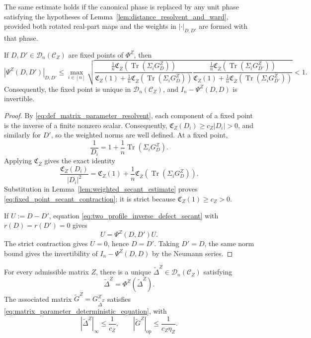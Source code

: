 \documentclass[EJP, preprint, NODS, nobera, nofontexpansion]{ejpecp}
\DeclareMathOperator{\op}{op}
\DeclareMathOperator{\tr}{Tr}
\begin{document}
The same estimate holds if the canonical phase is replaced by any
unit phase satisfying the hypotheses of
Lemma~\ref{lem:distance_resolvent_and_ward}, provided both rotated
real-part maps and the weights in $|\cdot|_{D,D'}$ are formed with
that phase.

\begin{proposition}
\label{pro:fixed_point_secant_contraction}
If \(D,D'\in\mathcal D_n(\mathcal C_Z)\) are fixed points of \(\Phi^Z\),
then
\begin{equation}\label{eq:fixed_point_secant_contraction}
    |\Psi^Z(D,D')|_{D,D'}
    \leq
    \max_{i\in[n]}
    \sqrt{
        \frac{\frac1n\mathfrak C_{\bar Z}\!\left(\tr(\Sigma_iG_D^Z)\right)}{\mathfrak C_Z(1)+\frac1n\mathfrak C_{\bar Z}\!\left(\tr(\Sigma_iG_D^Z)\right)}
        \frac{\frac1n\mathfrak C_{\bar Z}\!\left(\tr(\Sigma_iG_{D'}^Z)\right)}{\mathfrak C_Z(1)+\frac1n\mathfrak C_{\bar Z}\!\left(\tr(\Sigma_iG_{D'}^Z)\right)}
    }
    <1.
\end{equation}
Consequently, the fixed point is unique in
\(\mathcal D_n(\mathcal C_Z)\), and
\(I_n-\Psi^Z(D,D)\) is invertible.

\end{proposition}

\begin{proof}
By \eqref{eq:def_matrix_parameter_resolvent}, each component of a fixed
point is the inverse of a finite nonzero scalar. Consequently,
\(\mathfrak C_Z(D_i)\geq c_Z|D_i|>0\), and similarly for \(D'\),
so the weighted norms are well defined. At a fixed point,
\[
    \frac1{D_i}
    =
    1+\frac1n\tr(\Sigma_iG_D^Z).
\]
Applying \(\mathfrak C_{\bar Z}\) gives the exact identity
\[
    \frac{\mathfrak C_Z(D_i)}{|D_i|^2}
    =
    \mathfrak C_Z(1)+\frac1n\mathfrak C_{\bar Z}\!\left(\tr(\Sigma_iG_D^Z)\right).
\]
Substitution in Lemma~\ref{lem:weighted_secant_estimate} proves
\eqref{eq:fixed_point_secant_contraction}; it is strict because
\(\mathfrak C_Z(1)\geq c_Z>0\).

If \(U:=D-D'\), equation
\eqref{eq:two_profile_inverse_defect_secant} with \(r(D)=r(D')=0\) gives
\[
    U=\Psi^Z(D,D')U.
\]
The strict contraction gives \(U=0\), hence \(D=D'\).
Taking \(D'=D\), the same norm bound gives the invertibility of
\(I_n-\Psi^Z(D,D)\) by the Neumann series.
\end{proof}

\begin{proposition}
\label{pro:matrix_parameter_fixed_point}
For every admissible matrix \(Z\), there is a unique
\(\widetilde\Delta^Z\in\mathcal D_n(\mathcal C_Z)\) satisfying
\[
    \widetilde\Delta^Z=\Phi^Z(\widetilde\Delta^Z).
\]
The associated matrix \(\widetilde G^Z=G_{\widetilde\Delta^Z}^Z\)
satisfies \eqref{eq:matrix_parameter_deterministic_equation}, with
\[
    |\widetilde\Delta^Z|_\infty\leq\frac1{c_Z},
    \qquad
    |\widetilde G^Z|_{\op}\leq\frac1{c_Z\eta_Z}.
\]
\end{proposition}
\end{document}
